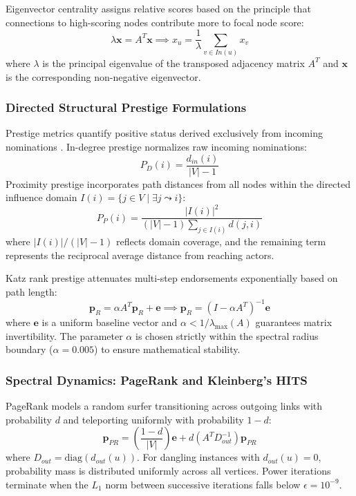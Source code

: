 \documentclass[conference]{IEEEtran}
\begin{document}
Eigenvector centrality assigns relative scores based on the principle that connections to high-scoring nodes contribute more to focal node score:
\begin{equation}
    \lambda \mathbf{x} = A^T \mathbf{x} \implies x_u = \frac{1}{\lambda} \sum_{v \in In(u)} x_v
    \label{eq:eigenvector}
\end{equation}
where $\lambda$ is the principal eigenvalue of the transposed adjacency matrix $A^T$ and $\mathbf{x}$ is the corresponding non-negative eigenvector.

\subsubsection{Directed Structural Prestige Formulations}
Prestige metrics quantify positive status derived exclusively from incoming nominations \cite{wasserman1994social}. In-degree prestige normalizes raw incoming nominations:
\begin{equation}
    P_D(i) = \frac{d_{in}(i)}{|V| - 1}
    \label{eq:prestige_degree}
\end{equation}
Proximity prestige incorporates path distances from all nodes within the directed influence domain $I(i) = \{j \in V \mid \exists j \leadsto i\}$:
\begin{equation}
    P_P(i) = \frac{|I(i)|^2}{(|V| - 1) \sum_{j \in I(i)} d(j, i)}
    \label{eq:prestige_proximity}
\end{equation}
where $|I(i)| / (|V| - 1)$ reflects domain coverage, and the remaining term represents the reciprocal average distance from reaching actors.

Katz rank prestige attenuates multi-step endorsements exponentially based on path length:
\begin{equation}
    \mathbf{p}_R = \alpha A^T \mathbf{p}_R + \mathbf{e} \implies \mathbf{p}_R = (I - \alpha A^T)^{-1} \mathbf{e}
    \label{eq:prestige_katz}
\end{equation}
where $\mathbf{e}$ is a uniform baseline vector and $\alpha < 1/\lambda_{\max}(A)$ guarantees matrix invertibility. The parameter $\alpha$ is chosen strictly within the spectral radius boundary ($\alpha = 0.005$) to ensure mathematical stability.

\subsubsection{Spectral Dynamics: PageRank and Kleinberg's HITS}
PageRank models a random surfer transitioning across outgoing links with probability $d$ and teleporting uniformly with probability $1 - d$:
\begin{equation}
    \mathbf{p}_{PR} = \left( \frac{1 - d}{|V|} \right) \mathbf{e} + d \left( A^T D_{out}^{-1} \right) \mathbf{p}_{PR}
    \label{eq:pagerank}
\end{equation}
where $D_{out} = \text{diag}(d_{out}(u))$. For dangling instances with $d_{out}(u) = 0$, probability mass is distributed uniformly across all vertices. Power iterations terminate when the $L_1$ norm between successive iterations falls below $\epsilon = 10^{-9}$.
\end{document}
